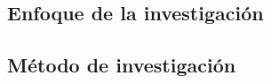 \documentclass[12pt,a4paper]{article}
\begin{document}
\subsection{Enfoque de la investigación}
%


\subsection{Método de investigación}

\end{document}
